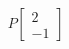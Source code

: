 \documentclass[preview]{standalone}
\begin{document}
\begin{align*}
P\begin{bmatrix}2\\-1\end{bmatrix}
\end{align*}
\end{document}
